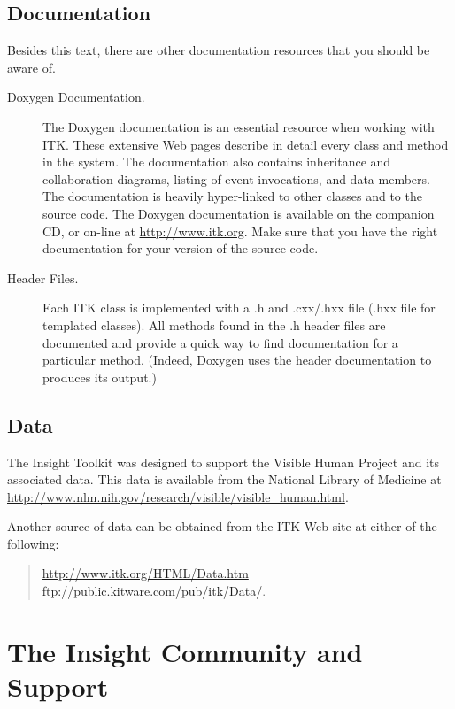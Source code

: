 \subsection{Documentation}
\label{sec:Documentation}

Besides this text, there are other documentation resources that you should be
aware of.
\begin{description}
        \item[Doxygen Documentation.] The Doxygen documentation is an
        essential resource when working with ITK. These extensive Web pages
        describe in detail every class and method in the system. The
        documentation also contains inheritance and collaboration diagrams,
        listing of event invocations, and data members. The documentation is
        heavily hyper-linked to other classes and to the source code. The
        Doxygen documentation is available on the companion CD, or on-line at
        \url{http://www.itk.org}. Make sure that you have the right documentation
        for your version of the source code.

	\item[Header Files.] Each ITK class is implemented with a .h and
        .cxx/.hxx file (.hxx file for templated classes). All methods
        found in the .h header files are documented and provide a quick way
        to find documentation for a particular method. (Indeed, Doxygen uses
        the header documentation to produces its output.)
\end{description}

\subsection{Data}
\label{sec:Data}

The Insight Toolkit was designed to support the Visible Human Project 
and its associated data. This data is available from the National Library of
Medicine at \url{http://www.nlm.nih.gov/research/visible/visible_human.html}.

Another source of data can be obtained from the ITK Web site at either
of the following:
\begin{quote}
\url{http://www.itk.org/HTML/Data.htm} \\
\url{ftp://public.kitware.com/pub/itk/Data/}.
\end{quote}

\section{The Insight Community and Support}
\label{sec:AdditionalResources}

